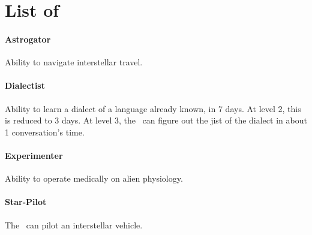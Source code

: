 \section{List of \abilityPC}
\hypertarget{abilities}{}

\paragraph{Astrogator}
\hypertarget{SkillAstrogator}{}
Ability to navigate interstellar travel.

\paragraph{Dialectist}
\hypertarget{SkillDialectist}{}
Ability to learn a dialect of a language already known, in 7 days. At level 2, this is reduced to 3 days. At level 3, the \pc\, can figure out the jist of the dialect in about 1 conversation's time.

\paragraph{Experimenter}
\hypertarget{SkillExperimenter}{}
Ability to operate medically on alien physiology.

\paragraph{Star-Pilot}
\hypertarget{SkillStar-Pilot}{}
The \pc\, can pilot an interstellar vehicle.